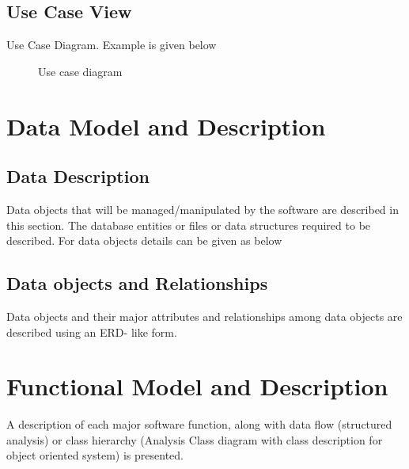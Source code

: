 \documentclass[oneside,a4paper,12pt]{report}
\begin{document}
\subsection{Use Case View}
Use Case Diagram. Example is given below
\begin{center}
	\begin{figure}[!htbp]
		\centering
	  \caption{Use case diagram}
	  \label{fig:usecase}
	\end{figure}
\end{center}

\section{Data Model and Description}
\subsection{Data Description}
Data objects that will be managed/manipulated by the software are described in this section. The database entities or files or data structures  required to be described. For data objects details can be given as below
\subsection{Data objects and Relationships}
  Data objects and their major attributes and relationships among data objects are described using an ERD- like form.



\section{Functional Model and Description}
A description of each major software function, along with data flow (structured analysis) or class hierarchy (Analysis Class diagram with class description for object oriented system) is presented.
\end{document}
